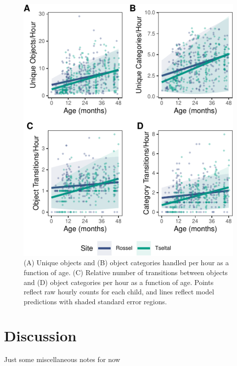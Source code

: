 \documentclass[10pt, letterpaper]{article}
\newenvironment{CodeChunk}{}{}
\begin{document}
\begin{CodeChunk}
\begin{figure}[!ht]

{\centering \includegraphics{figs/age-effects-fig-1} 

}

\caption[(A) Unique objects and (B) object categories handled per hour as a function of age]{(A) Unique objects and (B) object categories handled per hour as a function of age. (C) Relative number of transitions between objects and (D) object categories per hour as a function of age. Points reflect raw hourly counts for each child, and lines reflect model predictions with shaded standard error regions.}\label{fig:age-effects-fig}
\end{figure}
\end{CodeChunk}

\hypertarget{discussion}{%
\section{Discussion}\label{discussion}}

Just some miscellaneous notes for now
\end{document}
